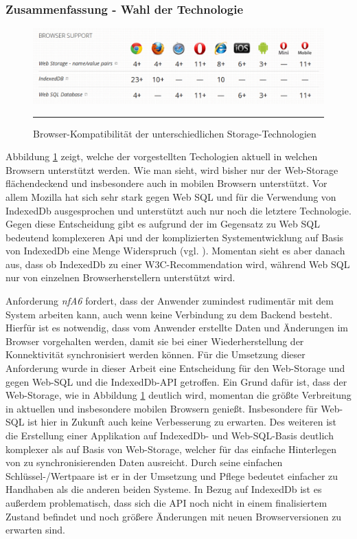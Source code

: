\subsubsection*{Zusammenfassung - Wahl der Technologie}
\begin{figure}[ht]
  \centering
  \includegraphics[width=\textwidth,height=\textheight,keepaspectratio]{./Figures/storage_browser_compatibility.pdf}
    \rule{35em}{0.5pt}
  \caption[Storage Browser Kompatibilität]{Browser-Kompatibilität der unterschiedlichen Storage-Technologien}
  \label{fig:storage_browser_compatibility}
\end{figure}
Abbildung \ref{fig:storage_browser_compatibility} zeigt, welche der vorgestellten Techologien aktuell in welchen Browsern unterstützt werden. Wie man sieht, wird bisher nur der Web-Storage flächendeckend und insbesondere auch in mobilen Browsern unterstützt. Vor allem Mozilla hat sich sehr stark gegen Web SQL und für die Verwendung von IndexedDb ausgesprochen und unterstützt auch nur noch die letztere Technologie. Gegen diese Entscheidung gibt es aufgrund der im Gegensatz zu Web SQL bedeutend komplexeren Api und der komplizierten Systementwicklung auf Basis von IndexedDb eine Menge Widerspruch (vgl. \cite{Ranganathan2010}). Momentan sieht es aber danach aus, dass ob IndexedDb zu einer W3C-Recommendation wird, während Web SQL nur von einzelnen Browserherstellern unterstützt wird.

Anforderung \emph{nfA6} fordert, dass der Anwender zumindest rudimentär mit dem System arbeiten kann, auch wenn keine Verbindung zu dem Backend besteht. Hierfür ist es notwendig, dass vom Anwender erstellte Daten und Änderungen im Browser vorgehalten werden, damit sie bei einer Wiederherstellung der Konnektivität synchronisiert werden können. Für die Umsetzung dieser Anforderung wurde in dieser Arbeit eine Entscheidung für den Web-Storage und gegen Web-SQL und die IndexedDb-API getroffen. Ein Grund dafür ist, dass der Web-Storage, wie in Abbildung \ref{fig:storage_browser_compatibility} deutlich wird, momentan die größte Verbreitung in aktuellen und insbesondere mobilen Browsern genießt. Insbesondere für Web-SQL ist hier in Zukunft auch keine Verbesserung zu erwarten. Des weiteren ist die Erstellung einer Applikation auf IndexedDb- und Web-SQL-Basis deutlich komplexer als auf Basis von Web-Storage, welcher für das einfache Hinterlegen von zu synchronisierenden Daten ausreicht. Durch seine einfachen Schlüssel-/Wertpaare ist er in der Umsetzung und Pflege bedeutet einfacher zu Handhaben als die anderen beiden Systeme. In Bezug auf IndexedDb ist es außerdem problematisch, dass sich die API noch nicht in einem finalisiertem Zustand befindet und noch größere Änderungen mit neuen Browserversionen zu erwarten sind.

